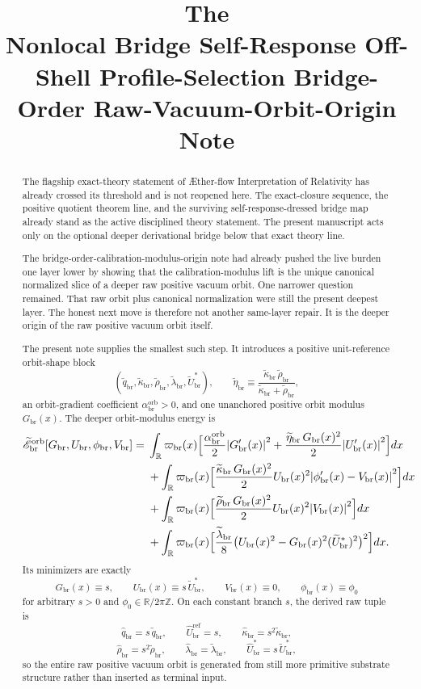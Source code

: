\documentclass[11pt]{article}
\title{\textbf{The \TheoryName{}}\\[0.4em]
\large Nonlocal Bridge Self-Response Off-Shell Profile-Selection Bridge-Order Raw-Vacuum-Orbit-Origin Note}
\author{}
\date{}
\newcommand{\Aflow}{\AE{}ther-flow}
\newcommand{\TheoryName}{\Aflow{} Interpretation of Relativity}
\newcommand{\ProfWeight}{\varpi_{\mathrm{br}}}
\newcommand{\RespVacAmp}{U_{\mathrm{br}}}
\newcommand{\RespVacPhase}{\phi_{\mathrm{br}}}
\newcommand{\RespVacCarrier}{V_{\mathrm{br}}}
\newcommand{\RespRawReadout}{\widehat q_{\mathrm{br}}}
\newcommand{\RespRawRef}{\widehat U_{\mathrm{br}}^{\mathrm{ref}}}
\newcommand{\RespRawCov}{\widehat\kappa_{\mathrm{br}}}
\newcommand{\RespRawRelax}{\widehat\rho_{\mathrm{br}}}
\newcommand{\RespRawWell}{\widehat\lambda_{\mathrm{br}}}
\newcommand{\RespRawEq}{\widehat U_{\mathrm{br}}^{\ast}}
\newcommand{\RespShapeReadout}{\widetilde q_{\mathrm{br}}}
\newcommand{\RespShapeCov}{\widetilde\kappa_{\mathrm{br}}}
\newcommand{\RespShapeRelax}{\widetilde\rho_{\mathrm{br}}}
\newcommand{\RespShapeWell}{\widetilde\lambda_{\mathrm{br}}}
\newcommand{\RespShapeEq}{\widetilde U_{\mathrm{br}}^{\ast}}
\newcommand{\RespShapeIso}{\widetilde\eta_{\mathrm{br}}}
\newcommand{\RespOrbitField}{G_{\mathrm{br}}}
\newcommand{\RespOrbitGrad}{\alpha_{\mathrm{br}}^{\mathrm{orb}}}
\newcommand{\RespOrbitEnergy}{\widetilde{\mathscr E}_{\mathrm{br}}^{\mathrm{orb}}}
\begin{document}
\maketitle

\begin{abstract}
The flagship exact-theory statement of \TheoryName{} has already crossed its threshold and is not reopened here. The exact-closure sequence, the positive quotient theorem line, and the surviving self-response-dressed bridge map already stand as the active disciplined theory statement. The present manuscript acts only on the optional deeper derivational bridge below that exact theory line.

The bridge-order-calibration-modulus-origin note had already pushed the live burden one layer lower by showing that the calibration-modulus lift is the unique canonical normalized slice of a deeper raw positive vacuum orbit. One narrower question remained. That raw orbit plus canonical normalization were still the present deepest layer. The honest next move is therefore not another same-layer repair. It is the deeper origin of the raw positive vacuum orbit itself.

The present note supplies the smallest such step. It introduces a positive unit-reference orbit-shape block
\[
(\RespShapeReadout,\RespShapeCov,\RespShapeRelax,\RespShapeWell,\RespShapeEq),
\qquad
\RespShapeIso\equiv\frac{\RespShapeCov\,\RespShapeRelax}{\RespShapeCov+\RespShapeRelax},
\]
an orbit-gradient coefficient \(\RespOrbitGrad>0\), and one unanchored positive orbit modulus \(\RespOrbitField(x)\). The deeper orbit-modulus energy is
\begin{align*}
\RespOrbitEnergy[\RespOrbitField,\RespVacAmp,\RespVacPhase,\RespVacCarrier]
=\;&
\int_{\mathbb R}\ProfWeight(x)\Bigl[
\frac{\RespOrbitGrad}{2}\abs{\RespOrbitField'(x)}^2
+
\frac{\RespShapeIso\,\RespOrbitField(x)^2}{2}\abs{\RespVacAmp'(x)}^2
\Bigr]dx
\nonumber\\
&+
\int_{\mathbb R}\ProfWeight(x)\Bigl[
\frac{\RespShapeCov\,\RespOrbitField(x)^2}{2}\RespVacAmp(x)^2
\abs{\RespVacPhase'(x)-\RespVacCarrier(x)}^2
\Bigr]dx
\nonumber\\
&+
\int_{\mathbb R}\ProfWeight(x)\Bigl[
\frac{\RespShapeRelax\,\RespOrbitField(x)^2}{2}\RespVacAmp(x)^2
\abs{\RespVacCarrier(x)}^2
\Bigr]dx
\nonumber\\
&+
\int_{\mathbb R}\ProfWeight(x)\Bigl[
\frac{\RespShapeWell}{8}\bigl(\RespVacAmp(x)^2-\RespOrbitField(x)^2(\RespShapeEq)^2\bigr)^2
\Bigr]dx.
\end{align*}
Its minimizers are exactly
\[
\RespOrbitField(x)\equiv s,\qquad
\RespVacAmp(x)\equiv s\,\RespShapeEq,\qquad
\RespVacCarrier(x)\equiv0,\qquad
\RespVacPhase(x)\equiv\phi_0
\]
for arbitrary \(s>0\) and \(\phi_0\in\mathbb R/2\pi\mathbb Z\). On each constant branch \(s\), the derived raw tuple is
\[
\RespRawReadout=s\,\RespShapeReadout,\qquad
\RespRawRef=s,\qquad
\RespRawCov=s^2\RespShapeCov,
\]
\[
\RespRawRelax=s^2\RespShapeRelax,\qquad
\RespRawWell=\RespShapeWell,\qquad
\RespRawEq=s\,\RespShapeEq,
\]
so the entire raw positive vacuum orbit is generated from still more primitive substrate structure rather than inserted as terminal input.


\end{abstract}
\end{document}
